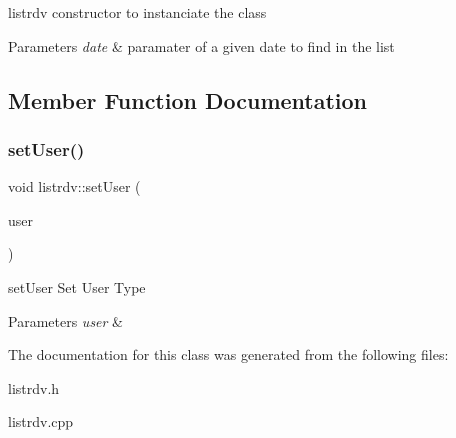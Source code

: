 listrdv constructor to instanciate the class 


\begin{DoxyParams}{Parameters}
{\em date} & paramater of a given date to find in the list \\
\hline
\end{DoxyParams}


\subsection{Member Function Documentation}
\mbox{\label{classlistrdv_aab827307c6c63d5a6c1d5e8cbfbb0d72}} 
\subsubsection{\texorpdfstring{setUser()}{setUser()}}
{\footnotesize\ttfamily void listrdv\+::set\+User (\begin{DoxyParamCaption}\item[{Q\+String}]{user }\end{DoxyParamCaption})\hspace{0.3cm}{\ttfamily [inline]}}



set\+User Set User Type 


\begin{DoxyParams}{Parameters}
{\em user} & \\
\hline
\end{DoxyParams}


The documentation for this class was generated from the following files\+:\begin{DoxyCompactItemize}
\item 
listrdv.\+h\item 
listrdv.\+cpp\end{DoxyCompactItemize}
